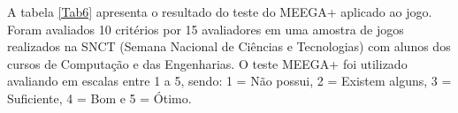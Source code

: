 \documentclass[10pt, conference, compsocconf]{IEEEtran}
\begin{document}
A tabela \ref{Tab6} apresenta o resultado do teste do MEEGA+ aplicado ao jogo. Foram avaliados 10 critérios por 15 avaliadores em uma amostra de jogos realizados na SNCT (Semana Nacional de Ciências e Tecnologias) com alunos dos cursos de Computação e das Engenharias. O teste MEEGA+ foi utilizado avaliando em escalas entre 1 a 5, sendo: 1 = Não possui, 2 = Existem alguns, 3 = Suficiente, 4 = Bom e 5 = Ótimo.  

\end{document}
